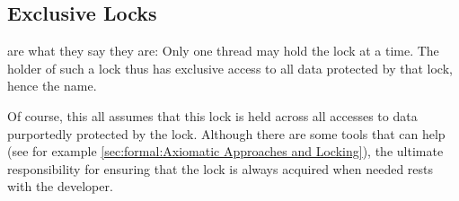 \subsection{Exclusive Locks}
\label{sec:locking:Exclusive Locks}

 are what they say they are:
Only one thread may hold the lock at a time.
The holder of such a lock thus has exclusive access to all data protected
by that lock, hence the name.

Of course, this all assumes that this lock is held across all accesses
to data purportedly protected by the lock.
Although there are some tools that can help (see for example
\cref{sec:formal:Axiomatic Approaches and Locking}),
the ultimate responsibility for ensuring that the lock is always acquired
when needed rests with the developer.

